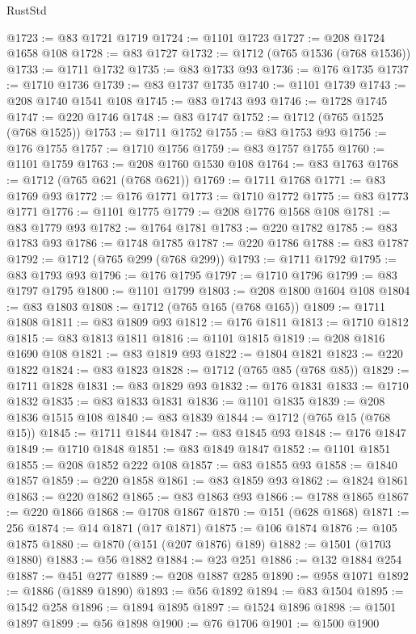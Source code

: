 \begin{lexlean}{RustStd}
\begin{coremodule}
@1723 := @83 @1721 @1719
@1724 := @1101 @1723
@1727 := @208 @1724 @1658 @108
@1728 := @83 @1727
@1732 := @1712 (@765 @1536 (@768 @1536))
@1733 := @1711 @1732
@1735 := @83 @1733 @93
@1736 := @176 @1735
@1737 := @1710 @1736
@1739 := @83 @1737 @1735
@1740 := @1101 @1739
@1743 := @208 @1740 @1541 @108
@1745 := @83 @1743 @93
@1746 := @1728 @1745
@1747 := @220 @1746
@1748 := @83 @1747
@1752 := @1712 (@765 @1525 (@768 @1525))
@1753 := @1711 @1752
@1755 := @83 @1753 @93
@1756 := @176 @1755
@1757 := @1710 @1756
@1759 := @83 @1757 @1755
@1760 := @1101 @1759
@1763 := @208 @1760 @1530 @108
@1764 := @83 @1763
@1768 := @1712 (@765 @621 (@768 @621))
@1769 := @1711 @1768
@1771 := @83 @1769 @93
@1772 := @176 @1771
@1773 := @1710 @1772
@1775 := @83 @1773 @1771
@1776 := @1101 @1775
@1779 := @208 @1776 @1568 @108
@1781 := @83 @1779 @93
@1782 := @1764 @1781
@1783 := @220 @1782
@1785 := @83 @1783 @93
@1786 := @1748 @1785
@1787 := @220 @1786
@1788 := @83 @1787
@1792 := @1712 (@765 @299 (@768 @299))
@1793 := @1711 @1792
@1795 := @83 @1793 @93
@1796 := @176 @1795
@1797 := @1710 @1796
@1799 := @83 @1797 @1795
@1800 := @1101 @1799
@1803 := @208 @1800 @1604 @108
@1804 := @83 @1803
@1808 := @1712 (@765 @165 (@768 @165))
@1809 := @1711 @1808
@1811 := @83 @1809 @93
@1812 := @176 @1811
@1813 := @1710 @1812
@1815 := @83 @1813 @1811
@1816 := @1101 @1815
@1819 := @208 @1816 @1690 @108
@1821 := @83 @1819 @93
@1822 := @1804 @1821
@1823 := @220 @1822
@1824 := @83 @1823
@1828 := @1712 (@765 @85 (@768 @85))
@1829 := @1711 @1828
@1831 := @83 @1829 @93
@1832 := @176 @1831
@1833 := @1710 @1832
@1835 := @83 @1833 @1831
@1836 := @1101 @1835
@1839 := @208 @1836 @1515 @108
@1840 := @83 @1839
@1844 := @1712 (@765 @15 (@768 @15))
@1845 := @1711 @1844
@1847 := @83 @1845 @93
@1848 := @176 @1847
@1849 := @1710 @1848
@1851 := @83 @1849 @1847
@1852 := @1101 @1851
@1855 := @208 @1852 @222 @108
@1857 := @83 @1855 @93
@1858 := @1840 @1857
@1859 := @220 @1858
@1861 := @83 @1859 @93
@1862 := @1824 @1861
@1863 := @220 @1862
@1865 := @83 @1863 @93
@1866 := @1788 @1865
@1867 := @220 @1866
@1868 := @1708 @1867
@1870 := @151 (@628 @1868)
@1871 := 256
@1874 := @14 @1871 (@17 @1871)
@1875 := @106 @1874
@1876 := @105 @1875
@1880 := @1870 (@151 (@207 @1876) @189)
@1882 := @1501 (@1703 @1880)
@1883 := @56 @1882
@1884 := @23 @251
@1886 := @132 @1884 @254
@1887 := @451 @277
@1889 := @208 @1887 @285
@1890 := @958 @1071
@1892 := @1886 (@1889 @1890)
@1893 := @56 @1892
@1894 := @83 @1504
@1895 := @1542 @258
@1896 := @1894 @1895
@1897 := @1524 @1896
@1898 := @1501 @1897
@1899 := @56 @1898
@1900 := @76 @1706
@1901 := @1500 @1900

\end{coremodule}
\end{lexlean}
